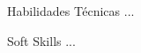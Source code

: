 
\begin{cvskills}
  \cvskill
    {Habilidades Técnicas} %
    {...} %


  \cvskill
    {Soft Skills} %
    {...} %

\end{cvskills}
